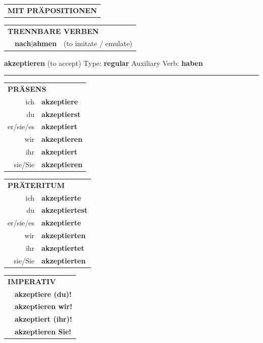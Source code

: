 \documentclass[10pt,a4paper]{revtex4-2}
\begin{document}
\begin{verbbox}
\vspace{10pt}

\begin{tabular}{lll}
\multicolumn{3}{l}{\textbf{MIT PRÄPOSITIONEN}}\\
\end{tabular}
\hfill
\begin{tabular}{lll}
\multicolumn{3}{l}{\textbf{TRENNBARE VERBEN}}\\
& \textbf{nach$|$ahmen} & (to imitate / emulate)\\
\end{tabular}
\vspace{-5pt}
\end{verbbox}

\begin{verbbox}
{\Large \bf akzeptieren} (to accept) \hfill Type: \textbf{regular} \hfill Auxiliary Verb: \textbf{haben} 

\vspace{5pt}
\hrule
\vspace{5pt}

\begin{tabular}{rl}
\multicolumn{2}{l}{\textbf{PRÄSENS}}\\
ich & \textbf{akzeptiere}\\
du & \textbf{akzeptierst}\\
er/sie/es & \textbf{akzeptiert}\\
wir & \textbf{akzeptieren}\\
ihr & \textbf{akzeptiert}\\
sie/Sie & \textbf{akzeptieren}\\
\end{tabular}
\hfill
\begin{tabular}{rl}
\multicolumn{2}{l}{\textbf{PRÄTERITUM}}\\
ich & \textbf{akzeptierte}\\
du & \textbf{akzeptiertest}\\
er/sie/es & \textbf{akzeptierte}\\
wir & \textbf{akzeptierten}\\
ihr & \textbf{akzeptiertet}\\
sie/Sie & \textbf{akzeptierten}\\
\end{tabular}
\hfill
\begin{tabular}{rl}
\multicolumn{2}{l}{\textbf{IMPERATIV}}\\
& \textbf{akzeptiere (du)!}\\
& \textbf{akzeptieren wir!}\\
& \textbf{akzeptiert (ihr)!}\\
& \textbf{akzeptieren Sie!}\\
\end{tabular}


\end{verbbox}
\end{document}
